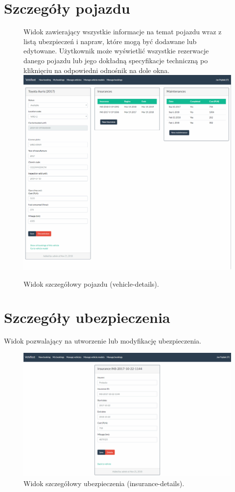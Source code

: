 \documentclass[eng,printmode,openany]{mgr}
\begin{document}
\begin{appendices}
		\section{Szczegóły pojazdu}	
		\begin{figure}[H]
			Widok zawierający wszystkie informacje na temat pojazdu wraz z listą ubezpieczeń i napraw, które mogą być dodawane lub edytowane. Użytkownik może wyświetlić wszystkie rezerwacje danego pojazdu lub jego dokładną specyfikacje techniczną po kliknięciu na odpowiedni odnośnik na dole okna.
			\centering
			\includegraphics[width=\textwidth]{images/views/vehicle-detail.png}
			\caption{Widok szczegółowy pojazdu (vehicle-details).}		
		\end{figure}
		
		\newpage
		\section{Szczegóły ubezpieczenia}
		Widok pozwalający na utworzenie lub modyfikację ubezpieczenia.
		\begin{figure}[H]
			\centering
			\includegraphics[scale=0.32]{images/views/insurance-detail.png}
			\caption{Widok szczegółowy ubezpieczenia (insurance-details).}		
		\end{figure}
		

\end{appendices}
\end{document}
